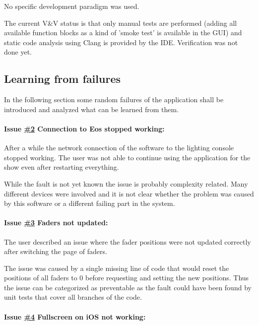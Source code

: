 \documentclass{scrartcl}
\begin{document}
No specific development paradigm was used.

The current V\&V status is that only manual tests are performed (adding all available function blocks as a kind of 'smoke test' is available in the GUI) and static code analysis using Clang is provided by the IDE. Verification was not done yet.

\subsection{Learning from failures}

In the following section some random failures of the application shall be introduced and analyzed what can be learned from them.

\paragraph{Issue \href{https://github.com/ETCLabs/LuminosusEosEdition/issues/2}{\#2} Connection to Eos stopped working:}

After a while the network connection of the software to the lighting console stopped working. The user was not able to continue using the application for the show even after restarting everything.

While the fault is not yet known the issue is probably complexity related. Many different devices were involved and it is not clear whether the problem was caused by this software or a different failing part in the system.


\paragraph{Issue \href{https://github.com/ETCLabs/LuminosusEosEdition/issues/3}{\#3} Faders not updated:}

The user described an issue where the fader positions were not updated correctly after switching the page of faders.

The issue was caused by a single missing line of code that would reset the positions of all faders to 0 before requesting and setting the new positions.
Thus the issue can be categorized as preventable as the fault could have been found by unit tests that cover all branches of the code.


\paragraph{Issue \href{https://github.com/ETCLabs/LuminosusEosEdition/issues/4}{\#4} Fullscreen on iOS not working:}
\end{document}
